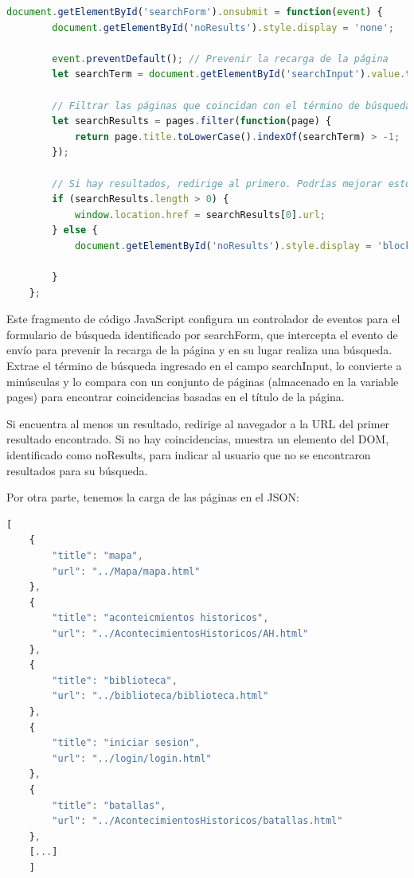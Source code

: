 \documentclass{article}
\begin{document}
\begin{lstlisting}[language=JavaScript, caption=Código para el buscador]
    document.getElementById('searchForm').onsubmit = function(event) {
        document.getElementById('noResults').style.display = 'none';
        
        event.preventDefault(); // Prevenir la recarga de la página
        let searchTerm = document.getElementById('searchInput').value.toLowerCase();

        // Filtrar las páginas que coincidan con el término de búsqueda
        let searchResults = pages.filter(function(page) {
            return page.title.toLowerCase().indexOf(searchTerm) > -1;
        });

        // Si hay resultados, redirige al primero. Podrías mejorar esto para mostrar una lista.
        if (searchResults.length > 0) {
            window.location.href = searchResults[0].url;
        } else {
            document.getElementById('noResults').style.display = 'block';   

        }
    };
\end{lstlisting}

Este fragmento de código JavaScript configura un controlador de eventos para el formulario de búsqueda identificado por searchForm, que intercepta el evento de envío para prevenir la recarga de la página y en su lugar realiza una búsqueda. Extrae el término de búsqueda ingresado en el campo searchInput, lo convierte a minúsculas y lo compara con un conjunto de páginas (almacenado en la variable pages) para encontrar coincidencias basadas en el título de la página. 

Si encuentra al menos un resultado, redirige al navegador a la URL del primer resultado encontrado. Si no hay coincidencias, muestra un elemento del DOM, identificado como noResults, para indicar al usuario que no se encontraron resultados para su búsqueda. 

Por otra parte, tenemos la carga de las páginas en el JSON:

\begin{lstlisting}[language=JavaScript, caption=Carga de las páginas en el JSON]
    [
    {
        "title": "mapa",
        "url": "../Mapa/mapa.html"
    },
    {
        "title": "aconteicmientos historicos",
        "url": "../AcontecimientosHistoricos/AH.html"
    },
    {
        "title": "biblioteca",
        "url": "../biblioteca/biblioteca.html"
    },
    {
        "title": "iniciar sesion",
        "url": "../login/login.html"
    },
    {
        "title": "batallas",
        "url": "../AcontecimientosHistoricos/batallas.html"
    },
    [...]
    ]
\end{lstlisting}
\end{document}
